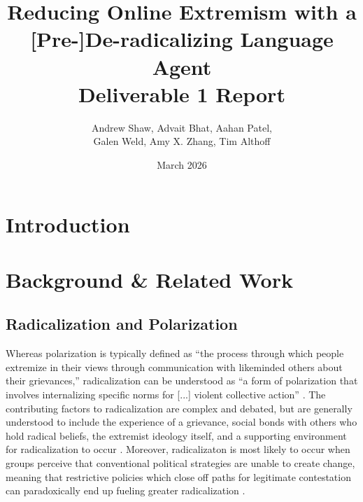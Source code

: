 \documentclass{article}
\title{Reducing Online Extremism with a [Pre-]De-radicalizing Language Agent\\\Large{Deliverable 1 Report}}
\author{Andrew Shaw, Advait Bhat, Aahan Patel,\\Galen Weld, Amy X. Zhang, Tim Althoff}
\date{March 2026}
\begin{document}
\maketitle

\section{Introduction}\label{sec:intro}

\section{Background \& Related Work}\label{sec:related}

\subsection{Radicalization and Polarization}\label{sec:radicalization_polarization}
Whereas polarization is typically defined as ``the process through which people extremize in their views through communication with likeminded others about their grievances,'' radicalization can be understood as ``a form of polarization that involves internalizing specific norms for [...] violent collective action'' \parencite{Smith2025PrimerOP}. The contributing factors to radicalization are complex and debated, but are generally understood to include the experience of a grievance, social bonds with others who hold radical beliefs, the extremist ideology itself, and a supporting environment for radicalization to occur \parencite{Leap2021RadicalizationAD}. Moreover, radicalizaton is most likely to occur when groups perceive that conventional political strategies are unable to create change, meaning that restrictive policies which close off paths for legitimate contestation can paradoxically end up fueling greater radicalization \parencite{Smith2025PrimerOP}.
\end{document}

